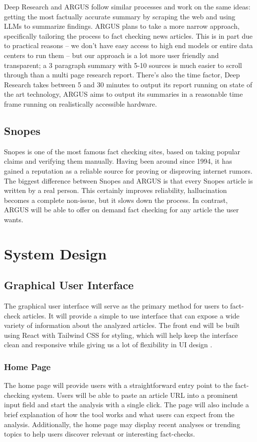 \documentclass[conference]{IEEEtran}
\begin{document}
Deep Research and ARGUS follow similar processes and work on the same ideas: getting the most factually accurate summary by scraping the web and using LLMs to summarize findings. ARGUS plans to take a more narrow approach, specifically tailoring the process to fact checking news articles. This is in part due to practical reasons -- we don't have easy access to high end models or entire data centers to run them -- but our approach is a lot more user friendly and transparent; a 3 paragraph summary with 5-10 sources is much easier to scroll through than a multi page research report. There's also the time factor, Deep Research takes between 5 and 30 minutes to output its report running on state of the art technology, ARGUS aims to output its summaries in a reasonable time frame running on realistically accessible hardware.

\subsection{Snopes}
Snopes is one of the most famous fact checking sites, based on taking popular claims and verifying them manually\cite{Snopes}. Having been around since 1994, it has gained a reputation as a reliable source for proving or disproving internet rumors\cite{Snopes}. The biggest difference between Snopes and ARGUS is that every Snopes article is written by a real person. This certainly improves reliability, hallucination becomes a complete non-issue, but it slows down the process. In contrast, ARGUS will be able to offer on demand fact checking for any article the user wants.

\section{System Design}
\subsection{Graphical User Interface}
The graphical user interface will serve as the primary method for users to fact-check articles. It will provide a simple to use interface that can expose a wide variety of information about the analyzed articles. The front end will be built using React with Tailwind CSS for styling, which will help keep the interface clean and responsive while giving us a lot of flexibility in UI design \cite{react, tailwind}.

\subsubsection{Home Page}
The home page will provide users with a straightforward entry point to the fact-checking system. Users will be able to paste an article URL into a prominent input field and start the analysis with a single click. The page will also include a brief explanation of how the tool works and what users can expect from the analysis. Additionally, the home page may display recent analyses or trending topics to help users discover relevant or interesting fact-checks.
\end{document}

